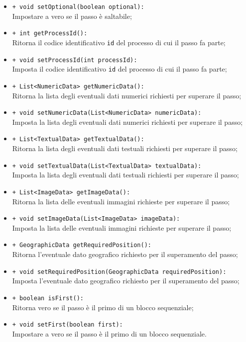 \begin{flushleft}
\begin{itemize}
\begin{sloppypar}
\begin{itemize}
\item \texttt{+ void setOptional(boolean optional):}\\ Impostare a vero se il passo è saltabile;
\item \texttt{+ int getProcessId():}\\ Ritorna il codice identificativo \texttt{id} del processo di cui il passo fa parte;
\item \texttt{+ void setProcessId(int processId):}\\ Imposta il codice identificativo \texttt{id} del processo di cui il passo fa parte;
\item \texttt{+ List<NumericData> getNumericData():}\\ Ritorna la lista degli eventuali dati numerici richiesti per superare il passo;
\item \texttt{+ void setNumericData(List<NumericData> numericData):}\\ Imposta la lista degli eventuali dati numerici richiesti per superare il passo;
\item \texttt{+ List<TextualData> getTextualData():}\\ Ritorna la lista degli eventuali dati testuali richiesti per superare il passo;
\item \texttt{+ void setTextualData(List<TextualData> textualData):}\\ Imposta la lista degli eventuali dati testuali richiesti per superare il passo;
\item \texttt{+ List<ImageData> getImageData():}\\ Ritorna la lista delle eventuali immagini richieste per superare il passo;
\item \texttt{+ void setImageData(List<ImageData> imageData):}\\ Imposta la lista delle eventuali immagini richieste per superare il passo;
\item \texttt{+ GeographicData getRequiredPosition():}\\ Ritorna l'eventuale dato geografico richiesto per il superamento del passo;
\item \texttt{+ void setRequiredPosition(GeographicData requiredPosition):}\\ Imposta l'eventuale dato geografico richiesto per il superamento del passo;
\item \texttt{+ boolean isFirst():}\\ Ritorna vero se il passo è il primo di un blocco sequenziale;
\item \texttt{+ void setFirst(boolean first):}\\ Impostare a vero se il passo è il primo di un blocco sequenziale.
\end{itemize}
\end{sloppypar}
\end{itemize}
\end{flushleft}

